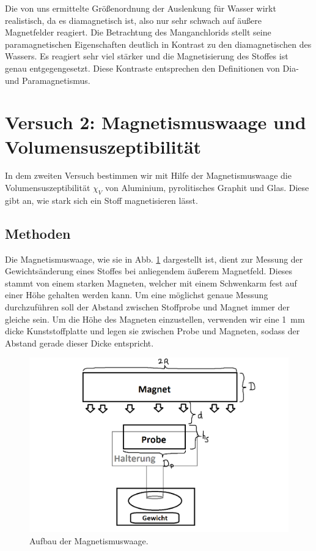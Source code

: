 \documentclass[11pt,a4paper,titlepage, ngerman]{article}
\begin{document}
			Die von uns ermittelte Größenordnung der Auslenkung für Wasser wirkt realistisch, da es diamagnetisch ist, also nur sehr schwach auf äußere Magnetfelder reagiert.
			Die Betrachtung des Manganchlorids stellt seine paramagnetischen Eigenschaften deutlich in Kontrast zu den diamagnetischen des Wassers.
			Es reagiert sehr viel stärker und die Magnetisierung des Stoffes ist genau entgegengesetzt.
			Diese Kontraste entsprechen den Definitionen von Dia- und Paramagnetismus.
			
	\section{Versuch 2: Magnetismuswaage  und Volumensuszeptibilität}		
		
		In dem zweiten Versuch bestimmen wir mit Hilfe der Magnetismuswaage die Volumensuszeptibilität $\chi _V$ von Aluminium, pyrolitisches Graphit und Glas. Diese gibt an, wie stark sich ein Stoff magnetisieren lässt.		
		
		\subsection*{Methoden} 
		
			Die Magnetismuswaage, wie sie in Abb. \ref{fig:Magnetismuswaage} dargestellt ist, dient zur Messung der Gewichtsänderung eines Stoffes bei anliegendem äußerem Magnetfeld.
			Dieses stammt von einem starken Magneten, welcher mit einem Schwenkarm fest auf einer Höhe gehalten werden kann.
			Um eine möglichst genaue Messung durchzuführen soll der Abstand zwischen Stoffprobe und Magnet immer der gleiche sein.
			Um die Höhe des Magneten einzustellen, verwenden wir eine \SI{1}{mm} dicke Kunststoffplatte und legen sie zwischen Probe und Magneten, sodass der Abstand gerade dieser Dicke entspricht.
			\begin{figure}[ht]
				\includegraphics[width=\textwidth]{SkizzeMagnetwaage.png}
				\caption{Aufbau der Magnetismuswaage.}
				\label{fig:Magnetismuswaage}
			\end{figure}
						
\end{document}
